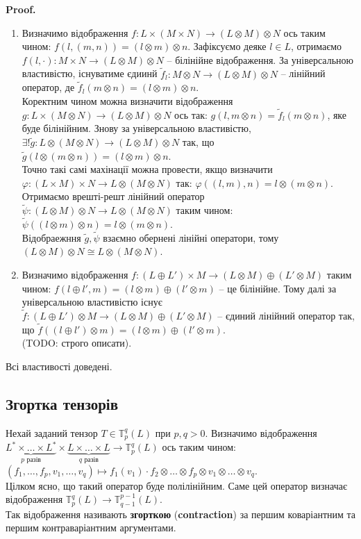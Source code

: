 \documentclass[a4paper, 10pt]{article}
\makeatletter
\theoremstyle{theoremdd}
\renewenvironment{proof}[1][Proof.\\]{\par
\pushQED{\hfill \qed}%
\normalfont \topsep6\p@\@plus6\p@\relax
\trivlist
\item\relax
{\bfseries
#1\@addpunct{.}}\hspace\labelsep\ignorespaces
}{%
\popQED\endtrivlist\@endpefalse
}
\makeatother
\begin{document}
\begin{proof}
\begin{enumerate}[wide=0pt,label={\arabic*)}]
\item Визначимо відображення $f \colon L \times (M \times N) \to (L \otimes M) \otimes N$ ось таким чином: $f(l, (m,n)) = (l \otimes m) \otimes n$. Зафіксуємо деяке $l \in L$, отримаємо $f(l, \cdot) \colon M \times N \to (L \otimes M) \otimes N$ -- білінійне відображення. За універсальною властивістю, існуватиме єдиинй $\tilde{f}_l \colon M \otimes N \to (L \otimes M) \otimes N$ -- лінійний оператор, де $\tilde{f}_l(m \otimes n) = (l \otimes m) \otimes n$.\\
Коректним чином можна визначити відображення $g \colon L \times (M \otimes N) \to (L \otimes M) \otimes N$ ось так: $g(l,m \otimes n) = \tilde{f}_l(m \otimes n)$, яке буде білінійним. Знову за універсальною властивістю, $\exists ! \tilde{g} \colon L \otimes (M \otimes N) \to (L \otimes M) \otimes N$ так, що $\tilde{g}(l \otimes (m \otimes n)) = (l \otimes m) \otimes n$.\\
Точно такі самі махінації можна провести, якщо визначити $\varphi \colon (L \times M) \times N \to L \otimes (M \otimes N)$ так: $\varphi((l,m),n) = l \otimes (m \otimes n)$. Отримаємо врешті-решт лінійний оператор $\tilde{\psi} \colon (L \otimes M) \otimes N \to L \otimes (M \otimes N)$ таким чином: $\tilde{\psi}((l \otimes m) \otimes n) = l \otimes (m \otimes n)$.\\
Відобраежння $\tilde{g},\tilde{\psi}$ взаємно обернені лінійні оператори, тому $(L \otimes M) \otimes N \cong L \otimes (M \otimes N)$.

\item Визначимо відображення $f \colon (L \oplus L') \times M \to (L \otimes M) \oplus (L' \otimes M)$ таким чином: $f(l \oplus l', m) = (l \otimes m) \oplus (l' \otimes m)$ -- це білінійне. Тому далі за універсальною властивістю існує $\tilde{f} \colon (L \oplus L') \otimes M \to (L \otimes M) \oplus (L' \otimes M)$ -- єдиний лінійний оператор так, що $\tilde{f}((l \oplus l') \otimes m) = (l \otimes m) \oplus (l' \otimes m)$.\\
(TODO: строго описати).
\end{enumerate}
Всі властивості доведені.
\end{proof}

\subsection{Згортка тензорів}
Нехай заданий тензор $T \in \mathbb{T}_p^q(L)$ при $p,q>0$. Визначимо відображення $\underbrace{L^* \times \dots \times L^*}_{p \text{ разів}} \times \underbrace{L \times \dots \times L}_{q \text{ разів}} \to \mathbb{T}_p^q(L)$ ось таким чином:\\
$(f_1,\dots,f_p, v_1,\dots,v_q) \mapsto f_1(v_1) \cdot f_2 \otimes \dots \otimes f_p \otimes v_1 \otimes \dots \otimes v_q$.\\
Цілком ясно, що такий оператор буде полілінійним. Саме цей оператор визначає відображення $\mathbb{T}_p^q(L) \to \mathbb{T}_{q-1}^{p-1}(L)$.\\
Так відображення називають \textbf{згорткою} (\textbf{contraction}) за першим коваріантним та першим контраваріантним аргументами.
\end{document}
